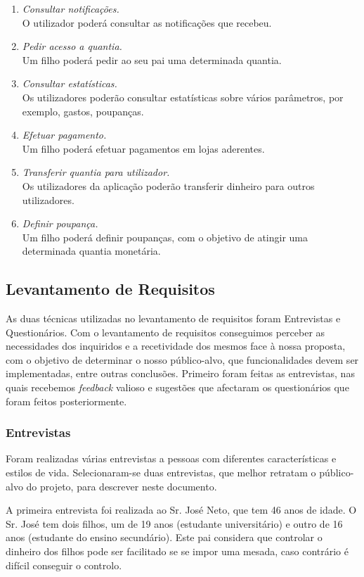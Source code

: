 \documentclass[12pt,a4paper]{article}
\begin{document}
\begin{enumerate}
      \item \emph{Consultar notificações.}\\
O utilizador poderá consultar as notificações que recebeu.
      \item \emph{Pedir acesso a quantia.}\\
Um filho poderá pedir ao seu pai uma determinada quantia.
      \item \emph{Consultar estatísticas.}\\
Os utilizadores poderão consultar estatísticas sobre vários parâmetros, por exemplo, gastos, poupanças.
      \item \emph{Efetuar pagamento.}\\
Um filho poderá efetuar pagamentos em lojas aderentes.
      \item \emph{Transferir quantia para utilizador.}\\
Os utilizadores da aplicação poderão transferir dinheiro para outros utilizadores.
      \item \emph{Definir poupança.}\\
Um filho poderá definir poupanças, com o objetivo de atingir uma determinada quantia monetária.
    \end{enumerate}


  \subsection{Levantamento de Requisitos}
    As duas técnicas utilizadas no levantamento de requisitos foram Entrevistas e Questionários. Com o levantamento de requisitos conseguimos perceber as necessidades dos inquiridos e a recetividade dos mesmos face à nossa proposta, com o objetivo de determinar o nosso público-alvo, que funcionalidades devem ser implementadas, entre outras conclusões. Primeiro foram feitas as entrevistas, nas quais recebemos \emph{feedback} valioso e sugestões que afectaram os questionários que foram feitos posteriormente.

    \subsubsection{Entrevistas}

      Foram realizadas várias entrevistas a pessoas com diferentes características e estilos de vida. Selecionaram-se duas entrevistas, que melhor retratam o público-alvo do projeto, para descrever neste documento.

      A primeira entrevista foi realizada ao Sr. José Neto, que tem 46 anos de idade. O Sr. José tem dois filhos, um de 19 anos (estudante universitário) e outro de 16 anos (estudante do ensino secundário). Este pai considera que controlar o dinheiro dos filhos pode ser facilitado se se impor uma mesada, caso contrário é difícil conseguir o controlo. 
\end{document}
